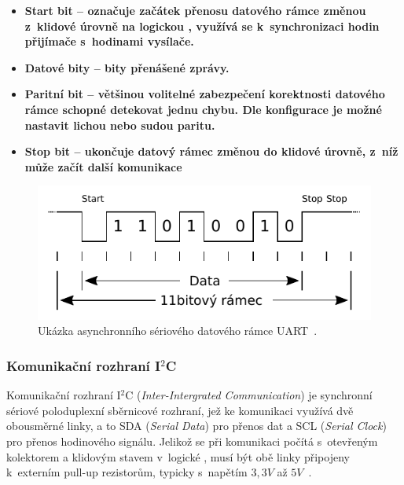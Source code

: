                 \begin{itemize}
                    \item \bf Start bit \rm -- označuje začátek přenosu datového rámce změnou z~klidové úrovně na logickou , využívá se k~synchronizaci hodin přijímače s~hodinami vysílače.
                    \item \bf Datové bity \rm -- bity přenášené zprávy.
                    \item \bf Paritní bit \rm -- většinou volitelné zabezpečení korektnosti datového rámce schopné detekovat jednu chybu. Dle konfigurace je možné nastavit lichou nebo sudou paritu.
                    \item \bf Stop bit \rm -- ukončuje datový rámec změnou do klidové úrovně, z~níž může začít další komunikace
                \end{itemize}

                \begin{figure}[h]
                    \centering
                    \includegraphics[width=0.8\linewidth]{obrazky-figures/uart.pdf}
                    \caption{Ukázka asynchronního sériového datového rámce UART~\cite{book:embedded_2}.}
                    \label{img:uart}
                \end{figure}

            \subsubsection{Komunikační rozhraní I$^2$C}
                Komunikační rozhraní I$^2$C (\textit{Inter-Intergrated Communication}) je synchronní sériové poloduplexní sběrnicové rozhraní, jež ke komunikaci využívá dvě obousměrné linky, a to SDA (\textit{Serial Data}) pro přenos dat a SCL (\textit{Serial Clock}) pro přenos hodinového signálu. Jelikož se při komunikaci počítá s~otevřeným kolektorem a klidovým stavem v~logické , musí být obě linky připojeny k~externím pull-up rezistorům, typicky s~napětím $3,3\unit{V}$ až $5\unit{V}$~\cite{book:elec}.
                
